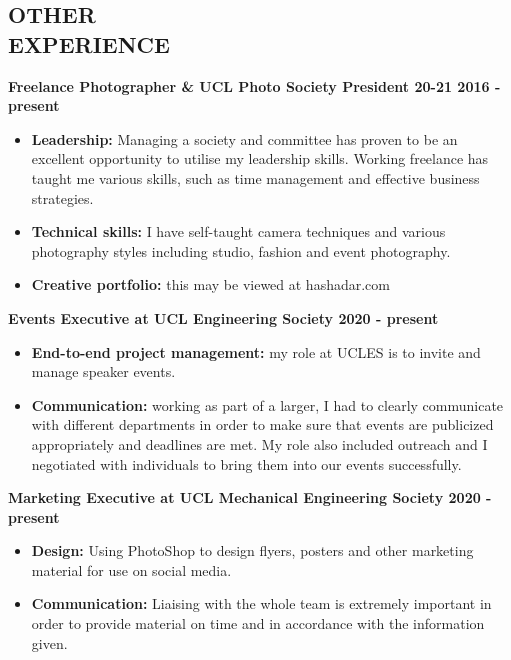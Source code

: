 \documentclass[margin, 10pt]{res} %
\begin{document}
\begin{resume}
 
 
\section{OTHER \\ EXPERIENCE}
\textbf{Freelance Photographer \& UCL Photo Society President 20-21 \hfill 2016 - present}
\\
\begin{itemize}
  \item \textbf{Leadership:} Managing a society and committee has proven to be an excellent opportunity to utilise my leadership skills. Working freelance has taught me various skills, such as time management and effective business strategies.
  \item \textbf{Technical skills:} I have self-taught camera techniques and various photography styles including studio, fashion and event photography.
  \item \textbf{Creative portfolio:} this may be viewed at hashadar.com
\end{itemize}

\textbf{Events Executive at UCL Engineering Society \hfill 2020 - present}
\\
\begin{itemize}
  \item \textbf{End-to-end project management:} my role at UCLES is to invite and manage speaker events. 
  \item \textbf{Communication:} working as part of a larger, I had to clearly communicate with different departments in order to make sure that events are publicized appropriately and deadlines are met. My role also included outreach and I negotiated with individuals to bring them into our events successfully.
\end{itemize}

\textbf{Marketing Executive at UCL Mechanical Engineering Society \hfill 2020 - present}
\\
\begin{itemize}
  \item \textbf{Design:} Using PhotoShop to design flyers, posters and other marketing material for use on social media. 
  \item \textbf{Communication:} Liaising with the whole team is extremely important in order to provide material on time and in accordance with the information given.
\end{itemize}


\end{resume}
\end{document}
